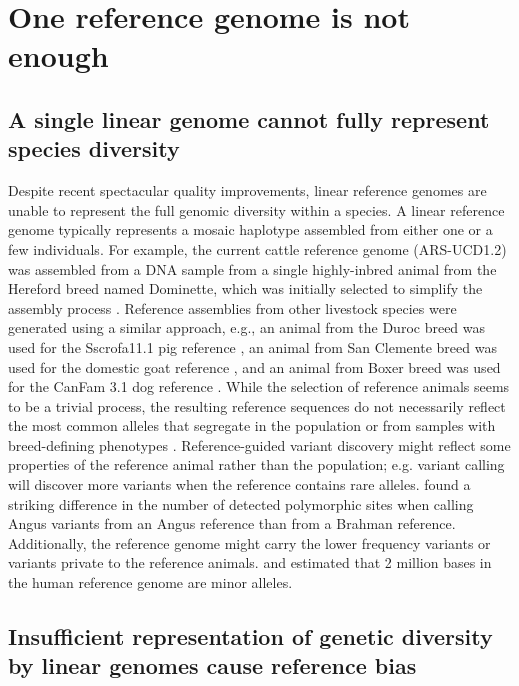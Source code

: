 \documentclass[../main.tex]{subfiles}
\begin{document}
\section{One reference genome is not enough}

\subsection*{A single linear genome cannot fully represent species diversity}

Despite recent spectacular quality improvements, linear reference genomes are unable to represent the full genomic diversity within a species. A linear reference genome typically represents a mosaic haplotype assembled from either one or a few individuals. For example, the current cattle reference genome (ARS-UCD1.2) was assembled from a DNA sample from a single highly-inbred animal from the Hereford breed named Dominette, which was initially selected to simplify the assembly process \citep{rosen2020novo}. Reference assemblies from  other livestock species were generated using a similar approach, e.g., an animal from the Duroc breed was used for the Sscrofa11.1 pig reference \citep{warr2020improved}, an animal from San Clemente breed was used for the domestic goat reference \citep{bickhart2017single}, and an animal from Boxer breed was used for the  CanFam 3.1 dog reference \citep{lindblad2005genome}. While the selection of reference animals seems to be a trivial process, the resulting reference sequences do not necessarily reflect the most common alleles that segregate in the population or from samples with breed-defining phenotypes \citep{ballouz2019time}. Reference-guided variant discovery might reflect some properties of the reference animal rather than the population; e.g. variant calling will discover more variants when the reference contains rare alleles. \citet{Low2020} found a striking difference in the number of detected polymorphic sites when calling Angus variants from an Angus reference than from a Brahman reference. Additionally, the reference genome might carry the lower frequency variants or variants private to the reference animals. \citet{shukla2019hg19kindel} and \citet{ballouz2019time} estimated that 2 million bases in the human reference genome are minor alleles. 

\subsection*{Insufficient representation of genetic diversity by linear genomes cause reference bias}
\end{document}
